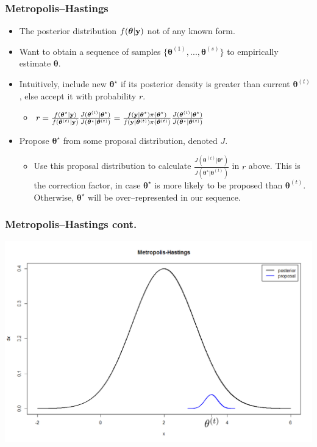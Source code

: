 \documentclass[black]{beamer}
\newcommand*\Myitem{%
    \item[\color{CUpurple}{\ding{111}}]}
\begin{document}
\begin{frame}
\frametitle{Metropolis--Hastings}
\begin{itemize}
\item The posterior distribution $f(\boldsymbol\theta|{\bf y})$ not of any known form.
\vspace{0.2cm}
\item Want to obtain a sequence of samples $\{\boldsymbol\theta^{(1)},...,\boldsymbol\theta^{(s)}\}$ to empirically estimate $\bm\theta$.
\vspace{0.2cm}
\item Intuitively, include new $\boldsymbol\theta^{\star}$ if its posterior density is greater than current $\boldsymbol\theta^{(t)}$, else accept it with probability $r$.
\vspace{0.2cm}
\begin{itemize}
\Myitem $r = \frac{f(\boldsymbol\theta^\star | {\bf y})}{f(\boldsymbol\theta^{(t)}|{\bf y})}\frac{J(\boldsymbol\theta^{(t)}|\boldsymbol\theta^\star)}{J(\boldsymbol\theta^\star|\boldsymbol\theta^{(t)})} = \frac{f({\bf y}|\boldsymbol\theta^\star)\pi(\boldsymbol\theta^\star)}{f({\bf y}|\boldsymbol\theta^{(t)})\pi(\boldsymbol\theta^{(t)})}\frac{J(\boldsymbol\theta^{(t)}|\boldsymbol\theta^\star)}{J(\boldsymbol\theta^\star|\boldsymbol\theta^{(t)})}$
\vspace{0.2cm}
\end{itemize}
\item Propose $\boldsymbol\theta^\star$ from some proposal distribution, denoted $J$.
\begin{itemize}
\Myitem Use this proposal distribution to calculate $\frac{J(\boldsymbol\theta^{(t)}|\boldsymbol\theta^\star)}{J(\boldsymbol\theta^\star|\boldsymbol\theta^{(t)})}$ in $r$ above.  This is the correction factor, in case $\boldsymbol\theta^\star$ is more likely to be proposed than $\boldsymbol\theta^{(t)}$.  Otherwise, $\boldsymbol\theta^\star$ will be over--represented in our sequence.
\end{itemize}
\end{itemize}
\end{frame}

\begin{frame}
\frametitle{Metropolis--Hastings cont.}
\includegraphics[scale=.38]{MH}
\end{frame}
\end{document}
